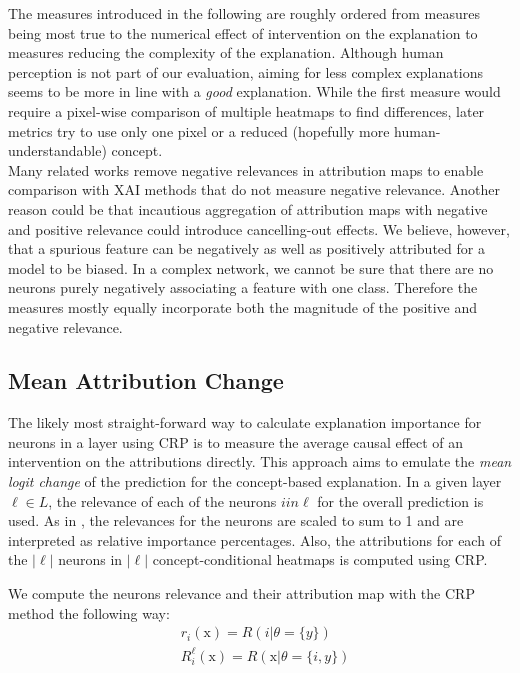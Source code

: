 The measures introduced in the following are roughly ordered from measures being most true to the numerical effect of intervention on the explanation to measures reducing the complexity of the explanation. Although human perception is not part of our evaluation, aiming for less complex explanations seems to be more in line with a \textit{good} explanation. While the first measure would require a pixel-wise comparison of multiple heatmaps to find differences, later metrics try to use only one pixel or a reduced (hopefully more human-understandable) concept. \\

Many related works remove negative relevances in attribution maps to enable comparison with XAI methods that do not measure negative relevance. Another reason could be that incautious aggregation of attribution maps with negative and positive relevance could introduce cancelling-out effects. We believe, however, that a spurious feature can be negatively as well as positively attributed for a model to be biased. In a complex network, we cannot be sure that there are no neurons purely negatively associating a feature with one class. Therefore the measures mostly equally incorporate both the magnitude of the positive and negative relevance. 

\subsection{Mean Attribution Change}
The likely most straight-forward way to calculate explanation importance for neurons in a layer using CRP is to measure the average causal effect of an intervention on the attributions directly. This approach aims to emulate the \textit{mean logit change} of the prediction for the concept-based explanation. In a given layer $\ell \in L$, the relevance of each of the neurons $i in \ell$ for the overall prediction is used. As in \cite{Achtibat2022}, the relevances for the neurons are scaled to sum to 1 and are interpreted as relative importance percentages.
Also, the attributions for each of the $|\ell|$ neurons in $|\ell|$ concept-conditional heatmaps is computed using CRP.

We compute the neurons relevance and their attribution map with the CRP method the following way:
\begin{align*}
& r_i(\mathrm{x}) = R(i | \theta=\{y\}) \\
& R_i^{\ell}(\mathrm{x}) = R(\mathrm{x} | \theta=\{i, y\}) \\
\end{align*}

